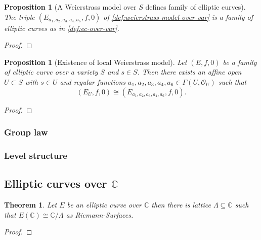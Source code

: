 \documentclass[a4paper,12pt,reqno]{amsart}
\newcommand{\field}[1]{\mathbb{#1}}  %
\newcommand{\C}{\field{C}} %
\newtheorem{theorem}[lemma]{Theorem}
\newtheorem{proposition}[lemma]{Proposition}
\theoremstyle{definition}
\numberwithin{lemma}{section}
\numberwithin{equation}{section}
\numberwithin{figure}{section}
\begin{document}
\begin{proposition}[A Weierstrass model over $S$ defines family of elliptic curves]\label{stmt:smooth-weierstrass-over-var-is-ec}
The triple $(E_{a_1,a_2,a_3,a_4,a_6},f,0)$ of \cref{def:weierstrass-model-over-var} is a family of elliptic curves as in \cref{def:ec-over-var}.
\end{proposition}
\begin{proof}
\end{proof}

\begin{proposition}[Existence of local Weierstrass model]\label{stmt:ec-over-var-has-local-weierstrass-model}
	Let $(E,f,0)$ be a family of elliptic curve over a variety $S$ and $s\in S$. Then there exists an affine open $U \subset S$ with $s \in U$ and regular functions $a_1,a_2,a_3,a_4,a_6 \in \Gamma(U,\mathcal O_U)$ such that 
	$$(E_U,f,0) \cong (E_{a_1,a_2,a_3,a_4,a_6},f,0).$$
\end{proposition}
\begin{proof}
\end{proof}



\subsubsection{Group law}

\subsubsection{Level structure}


\subsection{Elliptic curves over $\C$}
\begin{theorem}\label{stmt:complex-ec-is-C-mod-lattice}
	Let $E$ be an elliptic curve over $\C$ then there is lattice $\Lambda \subseteq \C$ such that $E(\C) \cong \C/\Lambda$ as Riemann-Surfaces.
\end{theorem}
\begin{proof}
\end{proof}
\end{document}
